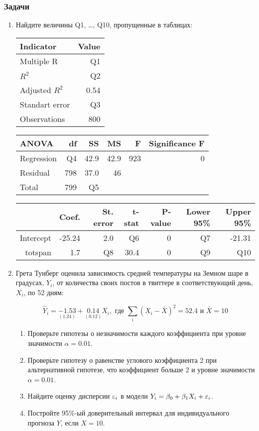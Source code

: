 \subsubsection*{Задачи}

\begin{enumerate}
\item Найдите величины Q1, \ldots, Q10, пропущенные в таблицах: 

\begin{tabular}{lr} \toprule
Indicator & Value \\
\midrule
Multiple R          & Q1 \\
$R^2$     			& Q2 \\
Adjusted $R^2$     	& 0.54 \\
Standart error 		& Q3 \\
Observations		& 800 \\
\bottomrule
\end{tabular}\hspace{2cm}
\begin{tabular}{lrrrrr} \toprule
ANOVA     	 &  df 	& SS		& MS 	& F & Significance F \\
\midrule
Regression   & Q4   	& 42.9  	& 42.9	&  923 	& 	0	\\
Residual     & 798  	& 37.0  	& 46	&  	&     	\\
Total        & 799  	& Q5        &    	&  	&     	\\
\bottomrule
\end{tabular}


\begin{tabular}{rrrrrrr}
\toprule
 			& Coef. 	& St. error	& t-stat & P-value	& Lower 95\% 	& Upper 95\% \\
\midrule
Intercept 	& -25.24 	& 2.0 	& Q6 		& 0 	&  Q7		& -21.31 \\
totspan		& 1.7		& Q8    & 30.4 	    & 0 	&  Q9	    & Q10 \\
\bottomrule
\end{tabular}


\item Грета Тунберг оценила зависимость средней температуры на Земном шаре в градусах, $Y_i$, 
от количества своих постов в твиттере в соответствующий день, $X_i$, по 52 дням:

\[
\hat Y_i = \underset{(1.24)}{-1.53} + \underset{(0.12)}{0.14} X_i, \text{ где } \sum_i (X_i - \bar X)^2 =52.4 \text{ и } \bar X = 10
\]

\begin{enumerate}
\item Проверьте гипотезы о незначимости каждого коэффициента при уровне значимости $\alpha = 0.01$.
\item Проверьте гипотезу о равенстве углового коэффициента 2 при альтернативной гипотезе, что 
коэффициент больше 2 и уровне значимости $\alpha = 0.01$.
\item Найдите оценку дисперсии $\varepsilon_i$ в модели $Y_i = \beta_0 + \beta_1 X_i + \varepsilon_i$.
\item Постройте 95\%-ый доверительный интервал для индивидуального прогноза $Y$, если $X=10$.



\end{enumerate}
\end{enumerate}

